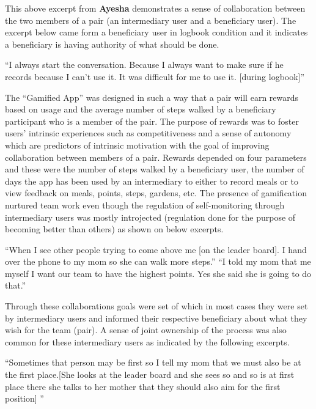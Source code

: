 This above excerpt from \textbf{Ayesha} demonstrates a sense of collaboration between the two members of a pair (an intermediary user and a beneficiary user). The excerpt below came form a beneficiary user in logbook condition and it indicates a beneficiary is having authority of what should be done. 

 {``I always start the conversation. Because I always want to make sure if he records because I can't use it. It was difficult for me to use it. [during logbook]''}

The ``Gamified App'' was designed in such a way that a pair will earn rewards based on usage and the average number of steps walked by a beneficiary participant who is a member of the pair. The purpose of rewards was to foster users' intrinsic experiences such as competitiveness and a sense of autonomy which are predictors of intrinsic motivation with the goal of improving collaboration between members of a pair. Rewards depended on four parameters and these were the number of steps walked by a beneficiary user, the number of days the app has been used by an intermediary to either to record meals or to view feedback on meals, points, steps, gardens, etc. The presence of gamification nurtured  team work  even though the regulation of self-monitoring through intermediary users was mostly introjected (regulation done for the purpose of becoming better than others) as shown on below excerpts.

 {``When I see other people trying to come above me [on the leader board]. I hand over the phone to my mom so she can walk more steps.''}
 {``I told my mom that me myself I want our team to have the highest points. Yes she said she is going to do that.''}

Through these collaborations goals were set of which in most cases they were set by intermediary users and informed their respective beneficiary about what they wish for the team (pair). A sense of joint ownership of the process was also common for these intermediary users as indicated by the following excerpts. 

 {``Sometimes that person may be first so I tell my mom that we must also be at the first place.[She looks at the  leader board and she sees so and so is at first place there she talks to her mother that they should also aim for the first position] ''} 

